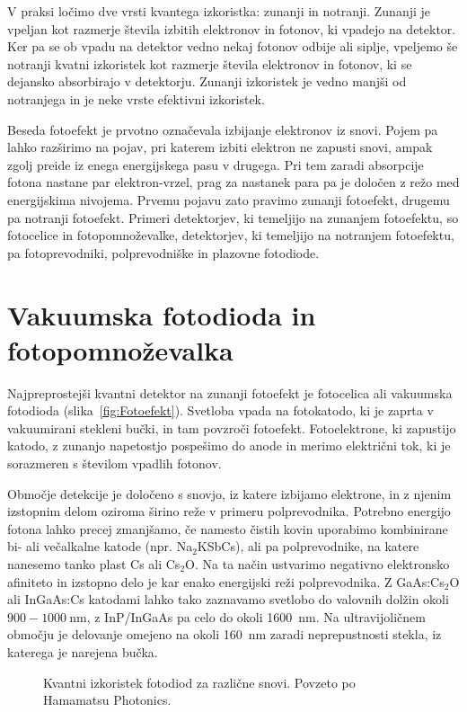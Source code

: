 \begin{remark}
V praksi ločimo dve vrsti kvantega izkoristka: zunanji in notranji. Zunanji je vpeljan kot 
razmerje števila izbitih elektronov in fotonov, ki vpadejo na detektor. Ker pa se 
ob vpadu na detektor vedno nekaj fotonov odbije ali siplje, vpeljemo še notranji kvatni 
izkoristek kot razmerje števila elektronov in fotonov, ki se dejansko absorbirajo v detektorju.
Zunanji izkoristek je vedno manjši od notranjega in je neke vrste efektivni izkoristek.
\end{remark}

Beseda fotoefekt je prvotno označevala izbijanje elektronov iz snovi. 
Pojem pa lahko razširimo na pojav, pri katerem izbiti elektron ne zapusti snovi, 
ampak zgolj preide iz enega energijskega pasu v drugega. Pri tem zaradi
absorpcije fotona nastane par elektron-vrzel, prag za nastanek para pa je določen
z režo med energijskima nivojema. Prvemu pojavu zato pravimo zunanji fotoefekt, 
drugemu pa notranji fotoefekt. Primeri detektorjev, ki temeljijo na zunanjem fotoefektu, so 
fotocelice in fotopomnoževalke, detektorjev, ki temeljijo na notranjem fotoefektu, pa
fotoprevodniki, polprevodniške in plazovne fotodiode.

\section{Vakuumska fotodioda in fotopomnoževalka}

Najpreprostejši kvantni detektor na zunanji fotoefekt je fotocelica ali vakuumska fotodioda
(slika~\ref{fig:Fotoefekt}). 
Svetloba vpada na fotokatodo, ki je zaprta v vakuumirani stekleni bučki, in tam povzroči
fotoefekt. Fotoelektrone, ki zapustijo katodo, z zunanjo napetostjo pospešimo do anode 
in merimo električni tok, ki je sorazmeren s številom vpadlih fotonov. 

Območje detekcije je določeno s snovjo, iz katere izbijamo elektrone, in z njenim izstopnim delom
oziroma širino reže v primeru polprevodnika.
Potrebno energijo fotona lahko precej zmanjšamo, 
če namesto čistih kovin uporabimo kombinirane bi- ali večalkalne katode (npr. Na$_2$KSbCs),
ali pa polprevodnike, na katere nanesemo tanko plast Cs ali Cs$_2$O. Na ta način ustvarimo 
negativno elektronsko afiniteto in izstopno delo je kar enako energijski
reži polprevodnika. Z GaAs:Cs$_2$O ali InGaAs:Cs 
katodami lahko tako zaznavamo svetlobo do valovnih dolžin okoli $900-1000~\si{\nano\metre}$,
z InP/InGaAs pa celo do okoli 1600~nm. Na ultravijoličnem območju je delovanje
omejeno na okoli 160~nm zaradi neprepustnosti stekla, iz katerega je narejena bučka.
\begin{figure}[h]
\centering
\def\svgwidth{100truemm} 

\caption{Kvantni izkoristek fotodiod za različne snovi. Povzeto po Hamamatsu Photonics.}
\label{fig:Fotodioda}
\end{figure}

